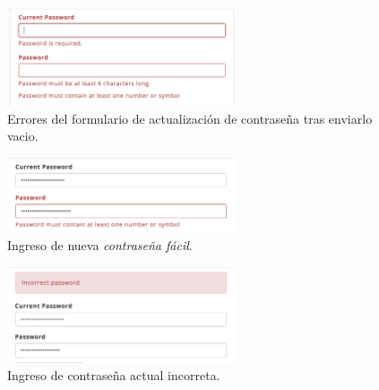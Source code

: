 \begin{figure}[H]
	\centering
	\includegraphics[width=0.6\textwidth]{figuras/formularios/update_password/empty_form_send.png}

	\caption{Errores del formulario de actualización de contraseña tras enviarlo vacio.}
	\label{figure:apendice:profile:form:update_password:empty_form_send}
\end{figure}

\begin{figure}[H]
	\centering
	\includegraphics[width=0.6\textwidth]{figuras/formularios/update_password/weak_password.png}

	\caption{Ingreso de nueva \textit{contraseña fácil}.}
	\label{figure:apendice:profile:form:update_password:week_password}
\end{figure}


\begin{figure}[H]
	\centering
	\includegraphics[width=0.6\textwidth]{figuras/formularios/update_password/incorrect_password.png}

	\caption{Ingreso de contraseña actual incorreta.}
	\label{figure:apendice:profile:form:update_password:incorrect_password}
\end{figure}